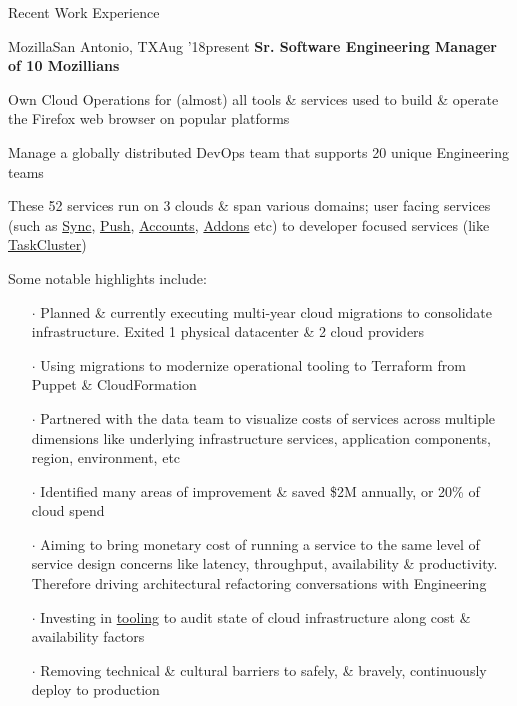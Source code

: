 \documentclass{resume} %
\begin{document}
\begin{rSection}{Recent Work Experience}


\begin{rSubsection}{Mozilla}{San Antonio, TX}{Aug '18}{present}
  {\textbf{Sr. Software Engineering Manager of 10 Mozillians}}

\item Own Cloud Operations for (almost) all tools \& services used to build \& operate the Firefox web browser on popular platforms
\item Manage a globally distributed DevOps team that supports 20 unique Engineering teams
  \item These 52 services run on 3 clouds \& span various domains; user facing services (such as \href{https://github.com/mozilla-services/syncstorage-rs}{Sync}, \href{https://github.com/mozilla-services/autopush-rs}{Push}, \href{https://github.com/mozilla/fxa}{Accounts}, \href{https://github.com/mozilla/addons}{Addons} etc) to developer focused services (like \href{https://github.com/taskcluster}{TaskCluster})
  \item Some notable highlights include:
  \vspace{-0.5em}
  \begin{itemize}  \itemsep0.5pt \parskip0pt
  \item[$\cdot$] Planned \& currently executing multi-year cloud migrations to consolidate infrastructure. Exited 1 physical datacenter \& 2 cloud providers
  \item[$\cdot$] Using migrations to modernize operational tooling to Terraform from Puppet \& CloudFormation
    \item[$\cdot$] Partnered with the data team to visualize costs of services across multiple dimensions like underlying infrastructure services, application components, region, environment, etc
    \item[$\cdot$] Identified many areas of improvement \& saved \$2M annually, or 20\% of cloud spend
    \item[$\cdot$] Aiming to bring monetary cost of running a service to the same level of service design concerns like latency, throughput, availability \& productivity. Therefore driving architectural refactoring conversations with Engineering
    \item[$\cdot$] Investing in \href{https://github.com/mozilla/frost}{tooling} to audit state of cloud infrastructure along cost \& availability factors
    \item[$\cdot$] Removing technical \& cultural barriers to safely, \& bravely, continuously deploy to production

\end{itemize}
\end{rSubsection}
\end{rSection}
\end{document}
